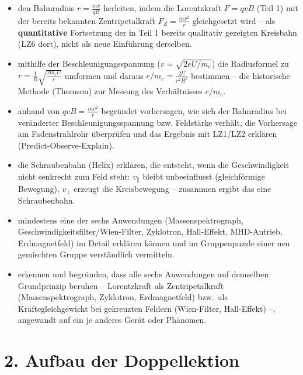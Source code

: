 \documentclass[11pt,a4paper]{article}
\begin{document}
\begin{itemize}[leftmargin=1.3cm,itemsep=0.3em]
  \item[LZ1] den Bahnradius $r=\frac{mv}{qB}$ herleiten, indem die
  Lorentzkraft $F=qvB$ (Teil 1) mit der bereits bekannten
  Zentripetalkraft $F_Z=\frac{mv^2}{r}$ gleichgesetzt wird -- als
  \textbf{quantitative} Fortsetzung der in Teil 1 bereits qualitativ
  gezeigten Kreisbahn (LZ6 dort), nicht als neue Einführung derselben.
  \item[LZ2] mithilfe der Beschleunigungsspannung
  ($v=\sqrt{2eU/m_e}$) die Radiusformel zu
  $r=\frac{1}{B}\sqrt{\frac{2m_eU}{e}}$ umformen und daraus
  $e/m_e=\frac{2U}{r^2B^2}$ bestimmen -- die historische Methode
  (Thomson) zur Messung des Verhältnisses $e/m_e$.
  \item[LZ3] anhand von $qvB=\frac{mv^2}{r}$ begründet vorhersagen, wie
  sich der Bahnradius bei veränderter Beschleunigungsspannung bzw.
  Feldstärke verhält, die Vorhersage am Fadenstrahlrohr überprüfen und
  das Ergebnis mit LZ1/LZ2 erklären (Predict-Observe-Explain).
  \item[LZ4] die Schraubenbahn (Helix) erklären, die entsteht, wenn die
  Geschwindigkeit nicht senkrecht zum Feld steht: $v_\parallel$ bleibt
  unbeeinflusst (gleichförmige Bewegung), $v_\perp$ erzeugt die
  Kreisbewegung -- zusammen ergibt das eine Schraubenbahn.
  \item[LZ5] mindestens eine der sechs Anwendungen (Massenspektrograph,
  Geschwindigkeitsfilter/Wien-Filter, Zyklotron, Hall-Effekt,
  MHD-Antrieb, Erdmagnetfeld) im Detail erklären können und im
  Gruppenpuzzle einer neu gemischten Gruppe verständlich vermitteln.
  \item[LZ6] erkennen und begründen, dass alle sechs Anwendungen auf
  demselben Grundprinzip beruhen -- Lorentzkraft als Zentripetalkraft
  (Massenspektrograph, Zyklotron, Erdmagnetfeld) bzw.\ als
  Kräftegleichgewicht bei gekreuzten Feldern (Wien-Filter, Hall-Effekt) --,
  angewandt auf ein je anderes Gerät oder Phänomen.
\end{itemize}

\section*{2. Aufbau der Doppellektion}
\end{document}
